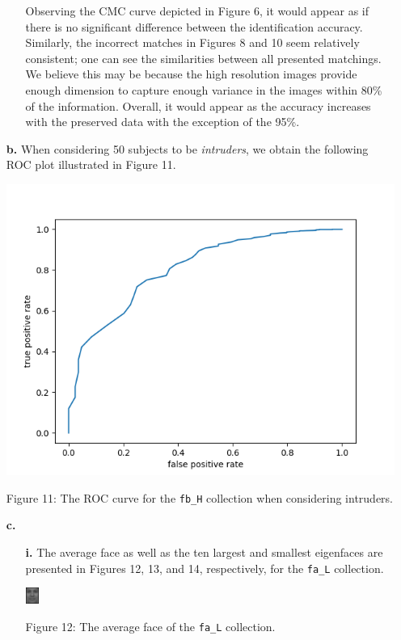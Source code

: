 \documentclass[ 12pt ]{article}
\begin{document}
\begin{enumerate}
\begin{enumerate}
                Observing the CMC curve depicted in Figure 6, it would appear as if there is no significant difference between the identification accuracy. Similarly,
                the incorrect matches in Figures 8 and 10 seem relatively consistent; one can see the similarities between all presented matchings. We believe this may be
                because the high resolution images provide enough dimension to capture enough variance in the images within 80\% of the information. Overall, it would
                appear as the accuracy increases with the preserved data with the exception of the 95\%.

        \end{enumerate}

    \item[\textbf{b.}] When considering 50 subjects to be \textit{intruders}, we obtain the following ROC plot illustrated in Figure 11.
        \begin{center}
            \includegraphics[scale=0.6]{roc_H}
        \end{center}
        \begin{center}
            \scriptsize
            Figure 11: The ROC curve for the \verb|fb_H| collection when considering intruders.
        \end{center}

    \item[\textbf{c.}]
        \begin{enumerate}
            \item[\textbf{i.}] The average face as well as the ten largest and smallest eigenfaces are presented in Figures 12, 13, and 14, respectively, for the \verb|fa_L| collection.
                \begin{center}
                    \includegraphics[scale=5]{AnyConv.com__average_face_2}
                \end{center}
                \begin{center}
                    \scriptsize
                    Figure 12: The average face of the \verb|fa_L| collection.
                \end{center}


\end{enumerate}
\end{enumerate}
\end{document}
